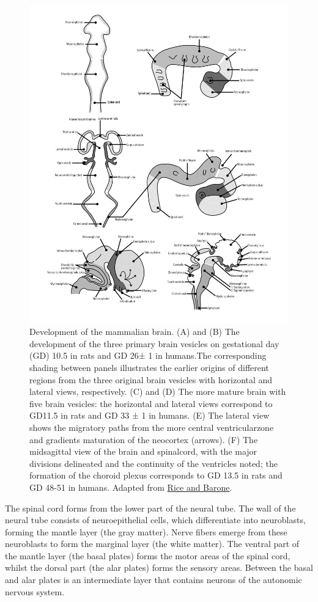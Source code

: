 \begin{figure}

{\centering \includegraphics[width=0.7\linewidth]{./figures/development/envhper00312-0143page3} 

}

\caption{Development of the mammalian brain. (A) and (B) The development of the three primary brain vesicles on gestational day (GD) 10.5 in rats and GD 26± 1 in humans.The corresponding shading between panels illustrates the earlier origins of different regions from the three original brain vesicles with horizontal and lateral views, respectively. (C) and (D) The more mature brain with five brain vesicles: the horizontal and lateral views correspond to GD11.5 in rats and GD 33 ± 1 in humans. (E) The lateral view shows the migratory paths from the more central ventricularzone and gradients maturation of the neocortex (arrows). (F) The midsagittal view of the brain and spinalcord, with the major divisions delineated and the continuity of the ventricles noted; the formation of the choroid plexus corresponds to GD 13.5 in rats and GD 48-51 in humans. Adapted from \href{https://www.ncbi.nlm.nih.gov/pubmed/10852851}{Rice and Barone}.}\label{fig:braindevelopment}
\end{figure}

The spinal cord forms from the lower part of the neural tube. The wall of the neural tube consists of neuroepithelial cells, which differentiate into neuroblasts, forming the mantle layer (the gray matter). Nerve fibers emerge from these neuroblasts to form the marginal layer (the white matter). The ventral part of the mantle layer (the basal plates) forms the motor areas of the spinal cord, whilst the dorsal part (the alar plates) forms the sensory areas. Between the basal and alar plates is an intermediate layer that contains neurons of the autonomic nervous system.



